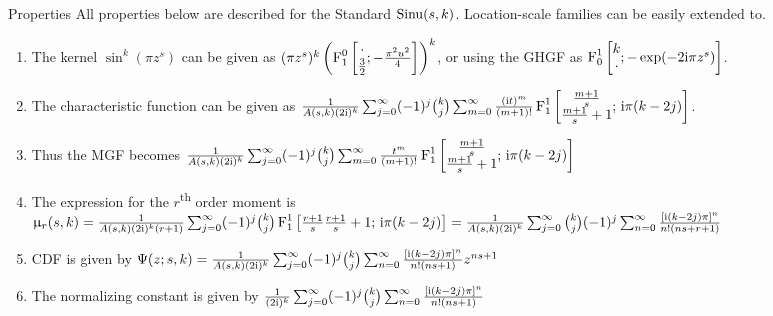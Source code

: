 \documentclass{beamer}
\begin{document}
\begin{frame}[allowframebreaks]{Properties}
All properties below are described for the Standard \sindist{} $\mathrm{Sinu}(s,k)$. Location-scale families can be easily extended to.
	\begin{enumerate}
		\item The kernel $\sin^k (\pi z^s)$ can be given as
		$(\pi z^s)^k \left( \operatorname{F}^0_1 \left[ \begin{matrix} \cdot \\ \frac{3}{2} \end{matrix}; -\frac{\pi^2 u^2}{4}\right] \right)^k$, or using the GHGF as $\operatorname{F}^1_0 \left[ \begin{matrix}k\\ \cdot\end{matrix};  -\exp(-2 \mathrm i \pi z^s) \right]$.
		\item The characteristic function can be given as $\frac{1}{A(s,k) (2\mathrm i)^k} \sum_{j=0}^{\infty} (-1)^j \binom{k}{j} \sum_{m=0}^{\infty} \frac{(\mathrm i t)^m}{(m+1)!} \operatorname{F}^1_1\left[ \begin{matrix}\frac{m+1}{s}\\ \frac{m+1}{s} + 1 \end{matrix};\, \mathrm i\pi(k-2j) \right]$.
		\item Thus the MGF becomes $\frac{1}{A(s,k) (2\mathrm i)^k} \sum_{j=0}^{\infty} (-1)^j \binom{k}{j} \sum_{m=0}^{\infty} \frac{t^m}{(m+1)!} \operatorname{F}^1_1\left[ \begin{matrix}\frac{m+1}{s}\\ \frac{m+1}{s} + 1 \end{matrix};\, \mathrm i\pi(k-2j) \right]$
		\item The expression for the $r$\textsuperscript{th} order moment is $\upmu_r(s,k) = \frac{1}{A(s,k) (2\mathrm i)^k (r+1)} \sum_{j=0}^{\infty} (-1)^j \binom{k}{j} \operatorname{F}^1_1 \left[ \begin{matrix}\frac{r+1}{s} \frac{r+1}{s} + 1\end{matrix}; \, \mathrm i\pi(k-2j) \right]
		= \frac{1}{A(s,k) (2\mathrm i)^k} \sum_{j=0}^\infty {k \choose j} (-1)^j \sum_{n=0}^{\infty} \frac{[\mathrm i (k-2j) \pi]^n}{n! (ns+r+1)}$
		\item CDF is given by $ \Psi(z; s,k) = \frac{1}{A(s,k) (2\mathrm i)^k} \sum_{j=0}^\infty (-1)^j {k \choose j} \sum_{n=0}^{\infty} \frac{[\mathrm i (k-2j) \pi]^n}{n! (ns+1)} z^{ns+1}$
		\item The normalizing constant is given by $\frac{1}{(2\mathrm i)^k} \sum_{j=0}^\infty (-1)^j {k \choose j} \sum_{n=0}^{\infty} \frac{[\mathrm i (k-2j) \pi]^n}{n! (ns+1)}$
	\end{enumerate}
\end{frame}
\end{document}

